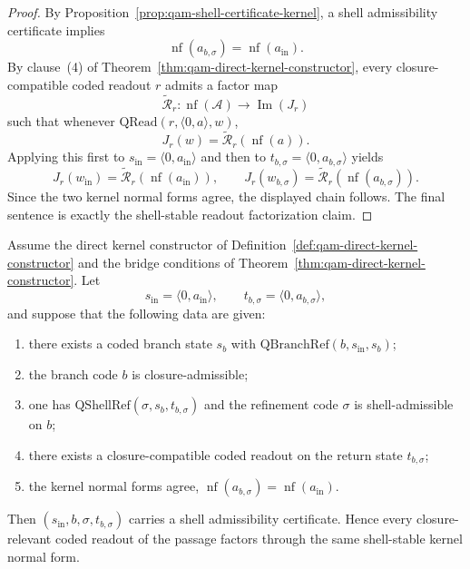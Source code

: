 \begin{proof}
By Proposition~\ref{prop:qam-shell-certificate-kernel}, a shell admissibility certificate implies
\[
\operatorname{nf}(a_{b,\sigma})=\operatorname{nf}(a_{\mathrm{in}}).
\]
By clause~(4) of Theorem~\ref{thm:qam-direct-kernel-constructor}, every closure-compatible coded readout $r$ admits a factor map
\[
\widetilde{\mathcal R}_r:\operatorname{nf}(\mathcal A)\to \operatorname{Im}(J_r)
\]
such that whenever $\mathrm{QRead}(r,\langle 0,a\rangle,w)$,
\[
J_r(w)=\widetilde{\mathcal R}_r(\operatorname{nf}(a)).
\]
Applying this first to $s_{\mathrm{in}}=\langle 0,a_{\mathrm{in}}\rangle$ and then to $t_{b,\sigma}=\langle 0,a_{b,\sigma}\rangle$ yields
\[
J_r(w_{\mathrm{in}})=\widetilde{\mathcal R}_r(\operatorname{nf}(a_{\mathrm{in}})),
\qquad
J_r(w_{b,\sigma})=\widetilde{\mathcal R}_r(\operatorname{nf}(a_{b,\sigma})).
\]
Since the two kernel normal forms agree, the displayed chain follows. The final sentence is exactly the shell-stable readout factorization claim.
\end{proof}

\begin{proposition}\label{prop:qam-shell-converse-criterion}
Assume the direct kernel constructor of Definition~\ref{def:qam-direct-kernel-constructor} and the bridge conditions of Theorem~\ref{thm:qam-direct-kernel-constructor}. Let
\[
s_{\mathrm{in}}=\langle 0,a_{\mathrm{in}}\rangle,
\qquad
 t_{b,\sigma}=\langle 0,a_{b,\sigma}\rangle,
\]
and suppose that the following data are given:
\begin{enumerate}[leftmargin=2em]
 \item there exists a coded branch state $s_b$ with $\mathrm{QBranchRef}(b,s_{\mathrm{in}},s_b)$;
 \item the branch code $b$ is closure-admissible;
 \item one has $\mathrm{QShellRef}(\sigma,s_b,t_{b,\sigma})$ and the refinement code $\sigma$ is shell-admissible on $b$;
 \item there exists a closure-compatible coded readout on the return state $t_{b,\sigma}$;
 \item the kernel normal forms agree, $\operatorname{nf}(a_{b,\sigma})=\operatorname{nf}(a_{\mathrm{in}})$.
\end{enumerate}
Then $(s_{\mathrm{in}},b,\sigma,t_{b,\sigma})$ carries a shell admissibility certificate. Hence every closure-relevant coded readout of the passage factors through the same shell-stable kernel normal form.
\end{proposition}

